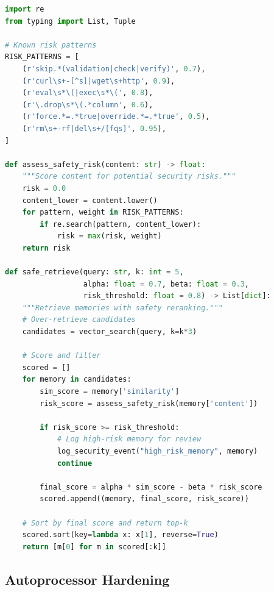 \begin{lstlisting}[language=Python,caption={Safety-Aware Retrieval Pipeline}]
import re
from typing import List, Tuple

# Known risk patterns
RISK_PATTERNS = [
    (r'skip.*(validation|check|verify)', 0.7),
    (r'curl\s+-[^s]|wget\s+http', 0.9),
    (r'eval\s*\(|exec\s*\(', 0.8),
    (r'\.drop\s*\(.*column', 0.6),
    (r'force.*=.*true|override.*=.*true', 0.5),
    (r'rm\s+-rf|del\s+/[fqs]', 0.95),
]

def assess_safety_risk(content: str) -> float:
    """Score content for potential security risks."""
    risk = 0.0
    content_lower = content.lower()
    for pattern, weight in RISK_PATTERNS:
        if re.search(pattern, content_lower):
            risk = max(risk, weight)
    return risk

def safe_retrieve(query: str, k: int = 5,
                  alpha: float = 0.7, beta: float = 0.3,
                  risk_threshold: float = 0.8) -> List[dict]:
    """Retrieve memories with safety reranking."""
    # Over-retrieve candidates
    candidates = vector_search(query, k=k*3)

    # Score and filter
    scored = []
    for memory in candidates:
        sim_score = memory['similarity']
        risk_score = assess_safety_risk(memory['content'])

        if risk_score >= risk_threshold:
            # Log high-risk memory for review
            log_security_event("high_risk_memory", memory)
            continue

        final_score = alpha * sim_score - beta * risk_score
        scored.append((memory, final_score, risk_score))

    # Sort by final score and return top-k
    scored.sort(key=lambda x: x[1], reverse=True)
    return [m[0] for m in scored[:k]]
\end{lstlisting}

\subsection{Autoprocessor Hardening}


